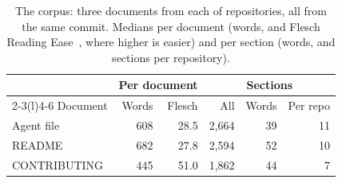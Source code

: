 \begin{table}[t]
\caption{The corpus: three documents from each of \nSampleRepos{} repositories, all from the same commit. Medians per document (words, and Flesch Reading Ease~\cite{flesch1948readability}, where higher is easier) and per section (words, and sections per repository).}
\label{tab:corpus}
\small\setlength{\tabcolsep}{4pt}
\begin{tabular}{@{}lrrrrr@{}}
\toprule
& \multicolumn{2}{c}{Per document} & \multicolumn{3}{c}{Sections} \\ \cmidrule(lr){2-3}\cmidrule(l){4-6} Document & Words & Flesch & All & Words & Per repo \\
\midrule
Agent file & 608 & 28.5 & 2{,}664 & 39 & 11 \\
README & 682 & 27.8 & 2{,}594 & 52 & 10 \\
CONTRIBUTING & 445 & 51.0 & 1{,}862 & 44 & 7 \\
\bottomrule
\end{tabular}
\end{table}
